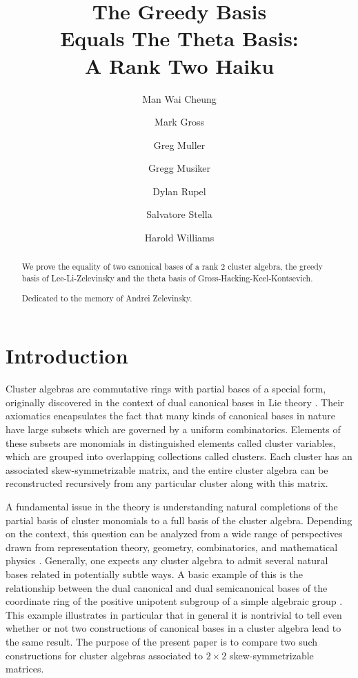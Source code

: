 \documentclass[11pt]{amsart}
\title[The Greedy Basis equals the Theta Basis]{The Greedy Basis \\ Equals The Theta Basis: \\ A Rank Two Haiku}
\author[Cheung]{Man Wai Cheung}
\author[Gross]{Mark Gross}
\author[Muller]{Greg Muller}
\author[Musiker]{Gregg Musiker}
\author[Rupel]{Dylan Rupel}
\author[Stella]{Salvatore Stella}
\author[Williams]{Harold Williams}
\theoremstyle{remark}
\numberwithin{equation}{section}
\begin{document}
\begin{abstract}
We prove the equality of two canonical bases of a rank 2 cluster algebra, the greedy basis of Lee-Li-Zelevinsky and the theta basis of Gross-Hacking-Keel-Kontsevich.

\bigskip

\begin{center}
{Dedicated to the memory of Andrei Zelevinsky.}
\end{center}

\end{abstract}


\maketitle

\section{Introduction}

Cluster algebras are commutative rings with partial bases of a special form, originally discovered in the context of dual canonical bases in Lie theory \cite{FZ}.  Their axiomatics encapsulates the fact that many kinds of canonical bases in nature have large subsets which are governed by a uniform combinatorics.  Elements of these subsets are monomials in distinguished elements called cluster variables, which are grouped into overlapping collections called clusters.  Each cluster has an associated skew-symmetrizable matrix, and the entire cluster algebra can be reconstructed recursively from any particular cluster along with this matrix.

A fundamental issue in the theory is understanding natural completions of the partial basis of cluster monomials to a full basis of the cluster algebra.  Depending on the context, this question can be analyzed from a wide range of perspectives drawn from representation theory, geometry, combinatorics, and mathematical physics \cite{Dup,KQ,FG,MSW,BZ,Rup2,GMN}.  Generally, one expects any cluster algebra to admit several natural bases related in potentially subtle ways.  A basic example of this is the relationship between the dual canonical and dual semicanonical bases of the coordinate ring of the positive unipotent subgroup of a simple algebraic group \cite{GLS}.  This example illustrates in particular that in general it is nontrivial to tell even whether or not two constructions of canonical bases in a cluster algebra lead to the same result.  The purpose of the present paper is to compare two such constructions for cluster algebras associated to $2\times2$ skew-symmetrizable matrices. 
\end{document}
